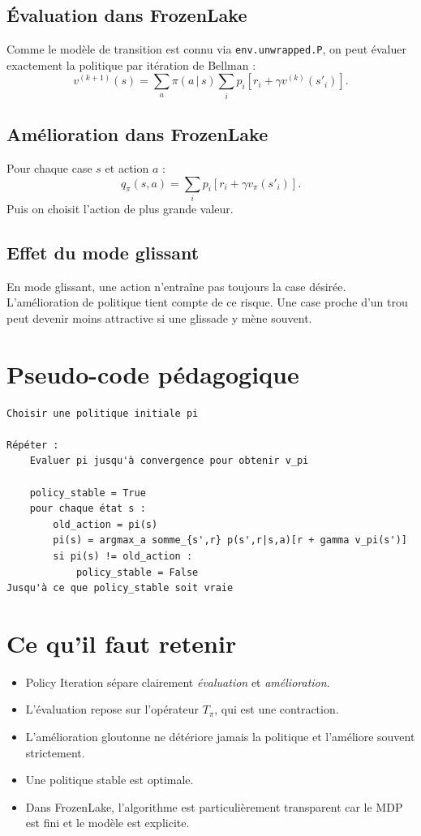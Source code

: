 \documentclass[11pt,a4paper]{article}
\newcommand{\given}{\,|\,}
\begin{document}
\subsection{Évaluation dans FrozenLake}

Comme le modèle de transition est connu via \texttt{env.unwrapped.P}, on peut évaluer exactement la politique par itération de Bellman :
\[
v^{(k+1)}(s)=\sum_a \pi(a\given s)\sum_i p_i\left[r_i+\gamma v^{(k)}(s'_i)\right].
\]

\subsection{Amélioration dans FrozenLake}

Pour chaque case $s$ et action $a$ :
\[
q_{\pi}(s,a)=\sum_i p_i\left[r_i+\gamma v_{\pi}(s'_i)\right].
\]
Puis on choisit l'action de plus grande valeur.

\subsection{Effet du mode glissant}

En mode glissant, une action n'entraîne pas toujours la case désirée. L'amélioration de politique tient compte de ce risque. Une case proche d'un trou peut devenir moins attractive si une glissade y mène souvent.

\section{Pseudo-code pédagogique}

\begin{verbatim}
Choisir une politique initiale pi

Répéter :
    Evaluer pi jusqu'à convergence pour obtenir v_pi

    policy_stable = True
    pour chaque état s :
        old_action = pi(s)
        pi(s) = argmax_a somme_{s',r} p(s',r|s,a)[r + gamma v_pi(s')]
        si pi(s) != old_action :
            policy_stable = False
Jusqu'à ce que policy_stable soit vraie
\end{verbatim}

\section{Ce qu'il faut retenir}

\begin{itemize}[leftmargin=1.6em]
    \item Policy Iteration sépare clairement \emph{évaluation} et \emph{amélioration}.
    \item L'évaluation repose sur l'opérateur $T_{\pi}$, qui est une contraction.
    \item L'amélioration gloutonne ne détériore jamais la politique et l'améliore souvent strictement.
    \item Une politique stable est optimale.
    \item Dans FrozenLake, l'algorithme est particulièrement transparent car le MDP est fini et le modèle est explicite.
\end{itemize}
\end{document}
